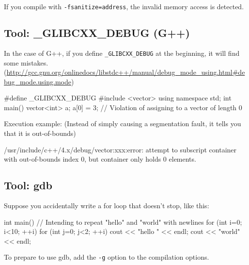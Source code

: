 If you compile with \texttt{-fsanitize=address}, the invalid memory access is detected.
\subsection{Tool: \_GLIBCXX\_DEBUG (G++)}

In the case of G++, if you define \texttt{\_GLIBCXX\_DEBUG} at the beginning, it will find some mistakes.
(\url{http://gcc.gnu.org/onlinedocs/libstdc++/manual/debug_mode_using.html#debug_mode.using.mode})

\begin{cbox}[emph={_GLIBCXX_DEBUG}]
#define _GLIBCXX_DEBUG
#include <vector>
using namespace std;
int main() {
    vector<int> a;
    a[0] = 3; // Violation of assigning to a vector of length 0
}
\end{cbox}

Execution example: (Instead of simply causing a segmentation fault, it tells you that it is out-of-bounds)
\begin{terminal}
/usr/include/c++/4.x/debug/vector:xxx:error: attempt to subscript container 
    with out-of-bounds index 0, but container only holds 0 elements.
\end{terminal}

\subsection{Tool: gdb}

Suppose you accidentally write a for loop that doesn't stop, like this:
\begin{cbox}
int main() { // Intending to repeat "hello" and "world" with newlines
  for (int i=0; i<10; ++i) {
    for (int j=0; j<2; ++i)
      cout << "hello " << endl;
    cout << "world" << endl;
  }
}
\end{cbox}

To prepare to use gdb, add the \texttt{-g} option to the compilation options.


